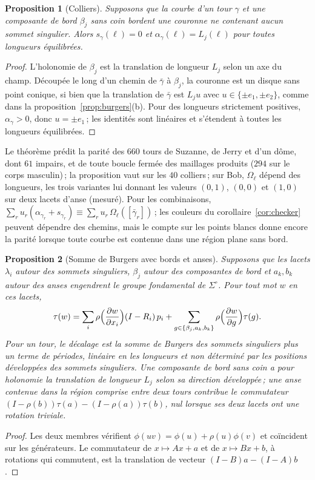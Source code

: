 \documentclass[11pt,a4paper]{article}
\newtheorem{proposition}{Proposition}
\newcommand{\shift}{s}
\begin{document}
\begin{proposition}[Colliers]\label{prop:collar}
Supposons que la courbe d'un tour $\gamma$ et une composante de bord
$\beta_j$ sans coin bordent une couronne ne contenant aucun sommet singulier.
Alors $\shift_\gamma(\ell) = 0$ et $\alpha_\gamma(\ell) = L_j(\ell)$ pour
toutes longueurs équilibrées.
\end{proposition}
\begin{proof}
L'holonomie de $\beta_j$ est la translation de longueur $L_j$ selon un axe du
champ. Découpée le long d'un chemin de $\bar\gamma$ à $\beta_j$, la couronne
est un disque sans point conique, si bien que la translation de $\bar\gamma$
est $L_j u$ avec $u \in \{\pm e_1, \pm e_2\}$, comme dans la
proposition~\ref{prop:burgers}(b). Pour des longueurs strictement positives,
$\alpha_\gamma > 0$, donc $u = \pm e_1$\,; les identités sont linéaires et
s'étendent à toutes les longueurs équilibrées.
\end{proof}

Le théorème prédit la parité des $660$ tours de Suzanne, de Jerry et d'un
dôme, dont $61$ impairs, et de toute boucle fermée des maillages produits
($294$ sur le corps masculin)\,; la proposition vaut sur les $40$ colliers\,;
sur Bob, $\Omega_\ell$ dépend des longueurs, les trois variantes lui donnant
les valeurs $(0, 1)$, $(0, 0)$ et $(1, 0)$ sur deux lacets d'anse (mesuré).
Pour les combinaisons, $\sum_r u_r(\alpha_{\gamma_r} + \shift_{\gamma_r})
\equiv \sum_r u_r\, \Omega_\ell([\bar\gamma_r])$\,; les couleurs du
corollaire~\ref{cor:checker} peuvent dépendre des chemins, mais le compte sur
les points blancs donne encore la parité lorsque toute courbe est contenue
dans une région plane sans bord.

\begin{proposition}[Somme de Burgers avec bords et anses]\label{prop:burgers-any}
Supposons que les lacets $\lambda_i$ autour des sommets singuliers, $\beta_j$
autour des composantes de bord et $a_k, b_k$ autour des anses engendrent le
groupe fondamental de $\Sigma^\circ$. Pour tout mot $w$ en ces lacets,
\[
  \tau(w) = \sum_i \rho\Bigl(\frac{\partial w}{\partial x_i}\Bigr)(I - R_i)\,p_i
  + \sum_{g \in \{\beta_j, a_k, b_k\}} \rho\Bigl(\frac{\partial w}{\partial g}\Bigr)\tau(g).
\]
Pour un tour, le décalage est la somme de Burgers des sommets singuliers plus
un \emph{terme de périodes}, linéaire en les longueurs et non déterminé par
les positions développées des sommets singuliers. Une composante de bord sans
coin a pour holonomie la translation de longueur $L_j$ selon sa direction
développée\,; une anse contenue dans la région comprise entre deux tours
contribue le commutateur $(I - \rho(b))\tau(a) - (I - \rho(a))\tau(b)$, nul
lorsque ses deux lacets ont une rotation triviale.
\end{proposition}
\begin{proof}
Les deux membres vérifient $\phi(uv) = \phi(u) + \rho(u)\phi(v)$ et
coïncident sur les générateurs. Le commutateur de $x \mapsto Ax + a$ et de $x
\mapsto Bx + b$, à rotations qui commutent, est la translation de vecteur $(I
- B)a - (I - A)b$.
\end{proof}
\end{document}
